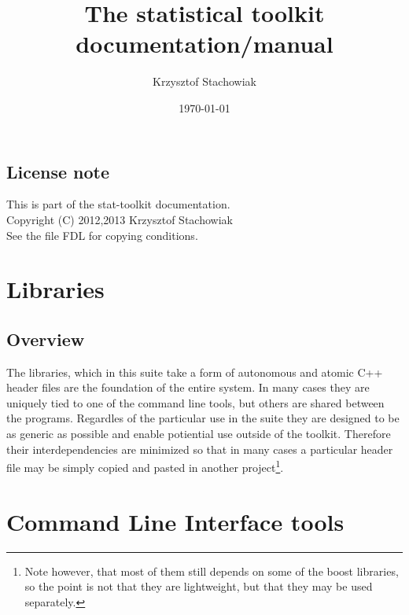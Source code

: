 \documentclass{report}
\begin{document}
\title{The statistical toolkit documentation/manual}
\author{Krzysztof Stachowiak}
\date{\today}

\maketitle

\tableofcontents

\section*{License note}
This is part of the stat-toolkit documentation.\\
Copyright (C) 2012,2013 Krzysztof Stachowiak\\
See the file FDL for copying conditions.

\chapter{Libraries}


\section{Overview}
The libraries, which in this suite take a form of autonomous and atomic C++
header files are the foundation of the entire system. In many cases they are
uniquely tied to one of the command line tools, but others are shared between
the programs. Regardles of the particular use in the suite they are designed to
be as generic as possible and enable potiential use outside of the toolkit.
Therefore their interdependencies are minimized so that in many cases a
particular header file may be simply copied and pasted in another
project\footnote{Note however, that most of them still depends on some of the boost
libraries, so the point is not that they are lightweight, but that they may be
used separately.}.





\chapter{Command Line Interface tools}






\end{document}
